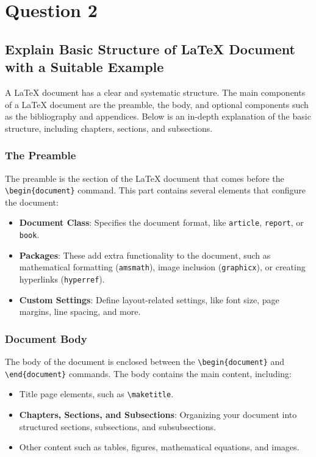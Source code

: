\chapter*{Question 2}

\section{Explain Basic Structure of LaTeX Document with a Suitable Example}

A LaTeX document has a clear and systematic structure. The main components of a LaTeX document are the preamble, the body, and optional components such as the bibliography and appendices. Below is an in-depth explanation of the basic structure, including chapters, sections, and subsections.

\subsection{The Preamble}
The preamble is the section of the LaTeX document that comes before the \texttt{\textbackslash begin\{document\}} command. This part contains several elements that configure the document:
\begin{itemize}
    \item \textbf{Document Class}: Specifies the document format, like \texttt{article}, \texttt{report}, or \texttt{book}.
    \item \textbf{Packages}: These add extra functionality to the document, such as mathematical formatting (\texttt{amsmath}), image inclusion (\texttt{graphicx}), or creating hyperlinks (\texttt{hyperref}).
    \item \textbf{Custom Settings}: Define layout-related settings, like font size, page margins, line spacing, and more.
\end{itemize}

\subsection{Document Body}
The body of the document is enclosed between the \texttt{\textbackslash begin\{document\}} and \texttt{\textbackslash end\{document\}} commands. The body contains the main content, including:
\begin{itemize}
    \item Title page elements, such as \texttt{\textbackslash maketitle}.
    \item \textbf{Chapters, Sections, and Subsections}: Organizing your document into structured sections, subsections, and subsubsections.
    \item Other content such as tables, figures, mathematical equations, and images.
\end{itemize}


